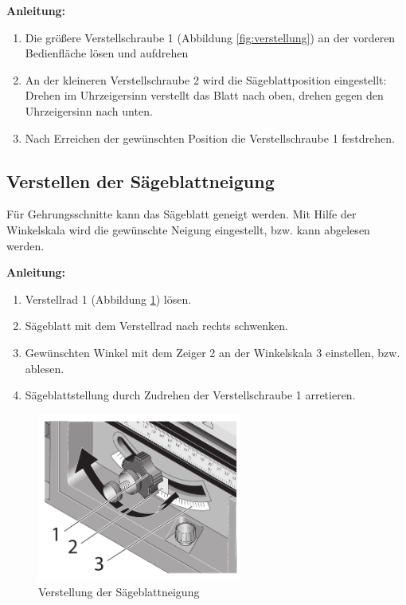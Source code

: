 \documentclass{\basedir/fablab-document}
\begin{document}
\textbf{Anleitung:} \\
\renewcommand{\labelenumi}{\alph{enumi})}
\begin{enumerate}
	\item Die größere Verstellschraube 1 (Abbildung \ref{fig:verstellung}) an der vorderen Bedienfläche lösen und aufdrehen
	\item An der kleineren Verstellschraube 2 wird die Sägeblattposition eingestellt: Drehen im Uhrzeigersinn verstellt das Blatt nach oben, drehen gegen den Uhrzeigersinn nach unten.
	\item Nach Erreichen der gewünschten Position die Verstellschraube 1 festdrehen.
\end{enumerate}


\subsection{Verstellen der Sägeblattneigung}

Für Gehrungsschnitte kann das Sägeblatt geneigt werden. Mit Hilfe der Winkelskala wird die gewünschte Neigung eingestellt, bzw. kann abgelesen werden.

\textbf{Anleitung:} \\
\renewcommand{\labelenumi}{\alph{enumi})}
\begin{enumerate}
	\item Verstellrad 1 (Abbildung \ref{fig:winkelverstellung}) lösen.
	\item Sägeblatt mit dem Verstellrad nach rechts schwenken.
	\item Gewünschten Winkel mit dem Zeiger 2 an der Winkelskala 3 einstellen, bzw. ablesen.
	\item Sägeblattstellung durch Zudrehen der Verstellschraube 1 arretieren.
\end{enumerate}

\begin{figure} [h]
	\centering
	\includegraphics[width=0.6\textwidth]{bilder/winkelverstellung.pdf}
	\caption{Verstellung der Sägeblattneigung}
	\label{fig:winkelverstellung}
\end{figure}
\end{document}
